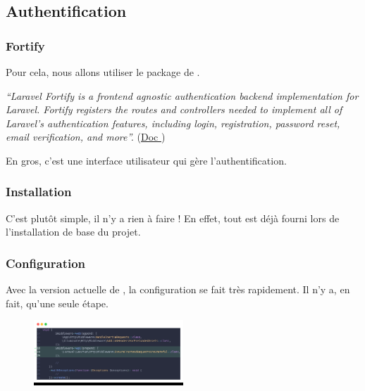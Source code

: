 \subsection[Authentification]{Authentification}\label{sec:auth}

\subsubsection[Fortify][laravel.com/docs/12.x/fortify]{Fortify}

Pour cela, nous allons utiliser le package \fortify{} de \laravel{}. 

\textit{``Laravel Fortify is a frontend agnostic authentication backend implementation for Laravel. Fortify registers the routes and controllers needed to implement all of Laravel's authentication features, including login, registration, password reset, email verification, and more''.} (\href{https://laravel.com/docs/12.x/fortify#what-is-fortify}{Doc \laravel})

En gros, c'est une interface utilisateur qui gère l'authentification.

\subsubsection[Installation]{Installation}

C'est plutôt simple, il n'y a rien à faire ! En effet, tout est déjà fourni lors de l'installation de base du projet.

\subsubsection[Configuration]{Configuration}

Avec la version actuelle de \laravel, la configuration se fait très rapidement. Il n'y a, en fait, qu'une seule étape.

\begin{figure}
    \vspace{-1cm}
    \colorbox{black}{\includegraphics[width=0.5\textwidth]{figures-C1/middleware_app.png}}
\end{figure}

